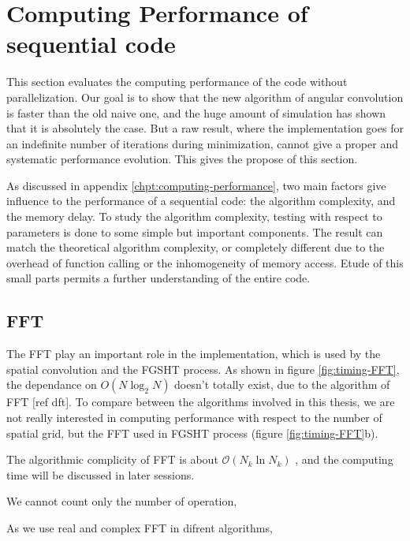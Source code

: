 
\chapter{Computing Performance of sequential code\label{chpt:seq-code-performance}}

This section evaluates the computing performance of the code without
parallelization. Our goal is to show that the new algorithm of angular
convolution is faster than the old naive one, and the huge amount
of simulation has shown that it is absolutely the case. But a raw
result, where the implementation goes for an indefinite number of
iterations during minimization, cannot give a proper and systematic
performance evolution. This gives the propose of this section. 

As discussed in appendix \ref{chpt:computing-performance}, two main
factors give influence to the performance of a sequential code: the
algorithm complexity, and the memory delay. To study the algorithm
complexity, testing with respect to parameters is done to some simple
but important components. The result can match the theoretical algorithm
complexity, or completely different due to the overhead of function
calling or the inhomogeneity of memory access. Etude of this small
parts permits a further understanding of the entire code.

\section{FFT}

The \acs{FFT} play an important role in the implementation, which
is used by the spatial convolution and the \acs{FGSHT} process. As
shown in figure \ref{fig:timing-FFT}, the dependance on $O(N\log_{2}N)$
doesn't totally exist, due to the algorithm of FFT {[}ref dft{]}.
To compare between the algorithms involved in this thesis, we are
not really interested in computing performance with respect to the
number of spatial grid, but the \acs{FFT} used in \acs{FGSHT} process
(figure \ref{fig:timing-FFT}b). 

The algorithmic complicity of FFT is about $\mathcal{O}(N_{k}\ln N_{k})$
\textcolor{red}{\scriptsize{}\citep{Numerical_Recipes_3ed} }, and
the computing time will be discussed in later sessions.

We cannot count only the number of operation, 

As we use real and complex FFT in difrent algorithms,

